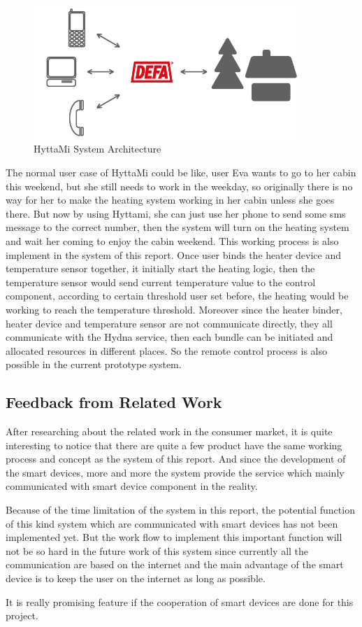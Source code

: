 \begin{figure}
	\centering    	
\includegraphics[width=0.90\textwidth,natwidth=610,natheight=642]{figs/hyttami_system.png}
  	\caption{HyttaMi System Architecture}
  	\label{fig:hyttami_system}
\end{figure}

\par The normal user case of HyttaMi could be like, user Eva wants to go to her cabin this weekend, but she still needs to work in the weekday, so originally there is no way for her to make the heating system working in her cabin unless she goes there. But now by using Hyttami, she can just use her phone to send some sms message to the correct number, then the system will turn on the heating system and wait her coming to enjoy the cabin weekend. This working process is also implement in the system of this report. Once user binds the heater device and temperature sensor together, it initially start the heating logic, then the temperature sensor would send current temperature value to the control component, according to certain threshold user set before, the heating would be working to reach the temperature threshold. Moreover since the heater binder, heater device and temperature sensor are not communicate directly, they all communicate with the Hydna service, then each bundle can be initiated and allocated resources in different places. So the remote control process is also possible in the current prototype system.

\subsection{Feedback from Related Work}
\par After researching about the related work in the consumer market, it is quite interesting to notice that there are quite a few product have the same working process and concept as the system of this report. And since the development of the smart devices, more and more the system provide the service which mainly communicated with smart device component in the reality.
\par Because of the time limitation of the system in this report, the potential function of this kind system which are communicated with smart devices has not been implemented yet. But the work flow to implement this important function will not be so hard in the future work of this system since currently all the communication are based on the internet and the main advantage of the smart device is to keep the user on the internet as long as possible.
\par It is really promising feature if the cooperation of smart devices are done for this project. 
